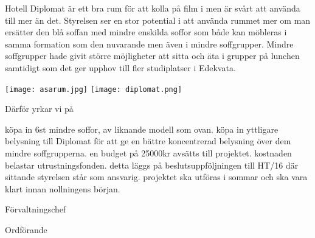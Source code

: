 \documentclass[../_main/handlingar.tex]{subfiles}
\begin{document}

Hotell Diplomat är ett bra rum för att kolla på film i men är svårt att använda till mer än det. Styrelsen ser en stor potential i att använda rummet mer om man ersätter den blå soffan med mindre enskilda soffor som både kan möbleras i samma formation som den nuvarande men även i mindre soffgrupper. Mindre soffgrupper hade givit större möjligheter att sitta och äta i grupper på lunchen samtidigt som det ger upphov till fler studiplatser i Edekvata.

\begin{center}
\texttt{[image: asarum.jpg]}
\texttt{[image: diplomat.png]}
\end{center}

Därför yrkar vi på
\begin{attsatser}
    \att köpa in 6st mindre soffor, av liknande modell som ovan.
    \att köpa in yttligare belysning till Diplomat för att ge en bättre koncentrerad belysning över dem mindre soffgrupperna.
    \att en budget på 25000kr avsätts till projektet.
    \att kostnaden belastar utrustningsfonden.
    \att detta läggs på beslutsuppföljningen till HT/16 där sittande styrelsen står som ansvarig.
    \att projektet ska utföras i sommar och ska vara klart innan nollningens början.
\end{attsatser}

\begin{signatures}{2}
    \ist
    \signature{Anders Nilsson}{Förvaltningschef}
    \signature{\ordf}{Ordförande}
\end{signatures}
\end{document}
